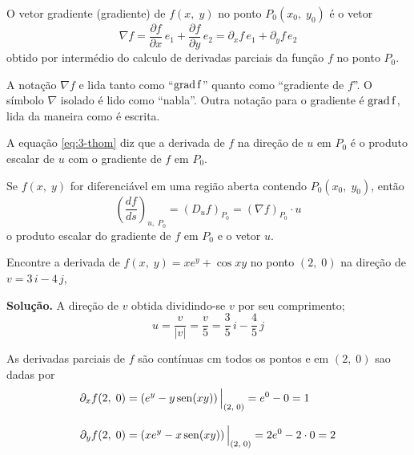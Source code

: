 \begin{defi}
	O vetor gradiente (gradiente) de \(f(x,\; y)\) no ponto \( P_{0}(x_{0},\; y_{0}) \) é o vetor
	\begin{equation*}
		\nabla f = \frac{\partial f }{\partial x}\, e_{1}+\frac{\partial f }{\partial y}\, e_{2}=
		\partial_{x}f\, e_{1}+\partial_{y}f\, e_{2}
	\end{equation*}
	obtido por intermédio do calculo de derivadas parciais da função \(f\) no ponto \(P_{0}\).
\end{defi}

A notação \(\nabla f\) e lida tanto como ``\(\rm{grad}\,f\)'' quanto como ``gradiente de \(f\)''. O símbolo
\(\nabla\) isolado é lido como ``nabla''. Outra notação para o gradiente é \( \rm{grad}\, f\), lida da maneira como é
escrita.

A equação \eqref{eq:3-thom} diz que a derivada de \(f\) na direção de \(u\) em \(P_{0}\) é o produto escalar de \(u\)
com o gradiente de \(f\) em \(P_{0}\).

\begin{teo}
	Se \(f(x,\; y)\) for diferenciável em uma região aberta contendo \(P_{0}(x_{0},\; y_{0})\), então
	\begin{equation}\label{eq:4-thom}
		\left(\frac{df}{ds}\right)_{u,\;P_{0}}=\left(D_{u}f\right)_{P_{0}}=(\nabla f)_{P_{0}}\cdot u
	\end{equation}
	o produto escalar do gradiente de \(f\) em \(P_{0}\) e o vetor \(u\).
\end{teo}


\begin{exc}
	Encontre a derivada de \( f(x,\; y)= xe^{y} +\cos xy\) no ponto \((2,\; 0)\) na direção de \(v = 3\,i -4\,j\),
\end{exc}

\textbf{Solução.}
A direção de \(v\) obtida dividindo-se \(v\) por seu comprimento;
\begin{equation*}
	u=\frac{v}{|v|}=\frac{v}{5}=\frac{3}{5}\, i-\frac{4}{5}\, j
\end{equation*}

As derivadas parciais de \(f\) são contínuas cm todos os pontos e em \((2,\; 0)\) sao dadas por
\begin{align*}
	\partial_{x}f(2,\; 0) & = \left(e^{y}-y\operatorname{sen}(xy)\right)\Big\vert_{(2,\; 0)}=e^{0}-0=1 \\[2ex]
	\partial_{y}f(2,\; 0) & =  \left(xe^{y}-x\operatorname{sen}(xy)\right)\Big\vert_{(2,\; 0)}=2e^{0}-2\cdot 0=2
\end{align*}

